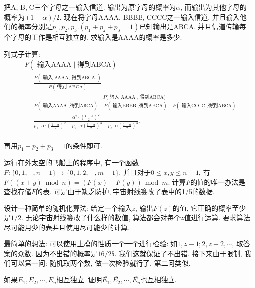 \begin{exercise}
    把A, B, C三个字母之一输入信道. 输出为原字母的概率为$\alpha$, 而输出为其他字母的概率为$(1-\alpha)/2$. 现在将字母AAAA, BBBB, CCCC之一输入信道, 并且输入他们的概率分别是$p_1, p_2, p_3.(p_1+p_2+p_3=1)$已知输出是ABCA, 并且信道传输每个字母的工作是相互独立的. 求输入是AAAA的概率是多少. 
\end{exercise}

\begin{solution*}
列式子计算: 
    $$
    \begin{aligned} & P(\text { 输入AAAA}  \mid \text{得到ABCA}) \\ & =\frac{P(\text { 输入 AAAA, 得到ABCA })}{P(\text { 得到 ABCA} )}  \\ & =\frac{P(\text { 输入 AAAA , 得到ABCA) }}{
        P(\text { 输入AAAA ,得到ABCA})+P(\text { 输入BBBB ,得到ABCA})+P(\text { 输入CCCC ,得到ABCA})  } \\ & =\frac{\alpha^2 \cdot\left(\frac{1-\alpha}{2}\right)^2}{p_1 \cdot \alpha^2\left(\frac{1-\alpha}{2}\right)^2+p_2 \cdot \alpha\left(\frac{1-\alpha}{2}\right)^3+p_3 \cdot \alpha\left(\frac{1-\alpha}{2}\right)^3} . \\ & \end{aligned}$$

    再用$p_1+p_2+p_3=1$的条件即可. 
\end{solution*}

\begin{exercise}
   运行在外太空的飞船上的程序中, 有一个函数$F:\{0,1,\cdots, n-1\}\to \{0,1,2,\cdots, m-1\}$. 并且对于$0\leq x,y\leq n-1$, 有$F((x+y)\bmod n)=(F(x)+F(y))\bmod m$. 计算$F$的值的唯一办法是查找存储$F$的表. 可是由于缺乏防护, 宇宙射线篡改了表中的1/5的数据. 

   设计一种简单的随机化算法: 给定一个输入$z$, 输出$F(z)$的值, 它正确的概率至少是$1/2$. 无论宇宙射线篡改了什么样的数值, 算法都会对每个$z$值进行运算. 要求算法尽可能用少的表并且使用尽可能少的计算. 
\end{exercise}

\begin{solution*}
   最简单的想法: 可以使用上模的性质一个一个进行检验: 如$1, z-1; 2,z-2,\cdots$, 取答案的众数. 因为不出错的概率是$16/25$. 我们这就保证了不出错. 接下来由于限制, 我们可以第一问: 随机取两个数, 做一次检验就行了. 第二问类似. 
\end{solution*}

\begin{exercise}
   如果$E_1, E_2, \cdots, E_n$相互独立, 证明$\overline{E_1}, \overline{E_2}, \cdots, \overline{E_n}$也互相独立. 
\end{exercise}

